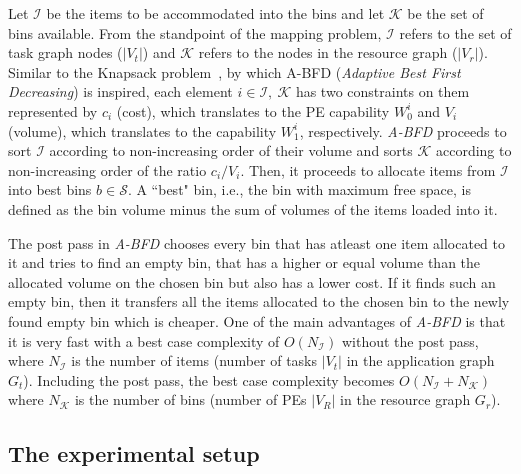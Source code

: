 Let $\mathcal{I}$ be the items to be accommodated into the bins and let
$\mathcal{K}$ be the set of bins available.  From the standpoint of the
mapping problem, $\mathcal{I}$ refers to the set of task graph nodes
($|V_t|$) and $\mathcal{K}$ refers to the nodes in the resource graph
($|V_r|$). Similar to the Knapsack problem~\cite{sski08}, by which A-BFD
(\textit{Adaptive Best First Decreasing}) is inspired, each element $i
\in \mathcal{I},\ \mathcal{K}$ has two constraints on them represented
by $c_i$ (cost), which translates to the PE capability $W^i_0$ and $V_i$
(volume), which translates to the capability $W^i_1$, respectively.
\textit{A-BFD} proceeds to sort $\mathcal{I}$ according
to non-increasing order of their volume and sorts $\mathcal{K}$
according to non-increasing order of the ratio $c_i/V_i$. Then, it
proceeds to allocate items from $\mathcal{I}$ into best bins $b \in
\mathcal{S}$. A ``best" bin, i.e., the bin with maximum free space, is
defined as the bin volume minus the sum of volumes of the items loaded
into it. %

The post pass in \textit{A-BFD} chooses every bin that has atleast one
item allocated to it and tries to find an empty bin, that has a higher
or equal volume than the allocated volume on the chosen bin but also has
a lower cost. If it finds such an empty bin, then it transfers all the
items allocated to the chosen bin to the newly found empty bin which is
cheaper. One of the main advantages of \textit{A-BFD} is that it is very
fast with a best case complexity of $O(N_\mathcal{I})$ without the post
pass, where $N_\mathcal{I}$ is the number of items (number of tasks
$|V_t|$ in the application graph $G_t$). Including the post pass, the
best case complexity becomes $O(N_\mathcal{I} + N_\mathcal{K})$ where
$N_\mathcal{K}$ is the number of bins (number of PEs $|V_R|$ in the
resource graph $G_r$).

\subsection{The experimental setup}
\label{sec:experimental-setup}

